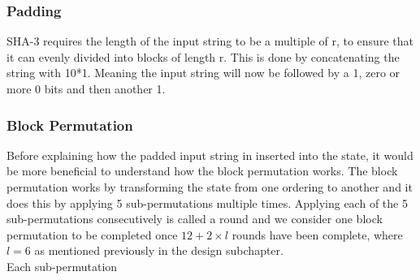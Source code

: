 \subsubsection{Padding}
SHA-3 requires the length of the input string to be a multiple of r, to ensure that it can evenly divided into blocks of length r. This is done by concatenating the string with 10*1. Meaning the input string will now be followed by a 1, zero or more 0 bits and then another 1. 
\subsubsection{Block Permutation}
Before explaining how the padded input string in inserted into the state, it would be more beneficial to understand how the block permutation works. The block permutation works by transforming the state from one ordering to another and it does this by applying 5 sub-permutations multiple times. Applying each of the 5 sub-permutations consecutively is called a round and we consider one block permutation to be completed once $12 + 2 \times l$ rounds have been complete, where $l = 6$ as mentioned previously in the design subchapter.
\vspace{5 mm}\\
Each sub-permutation 
